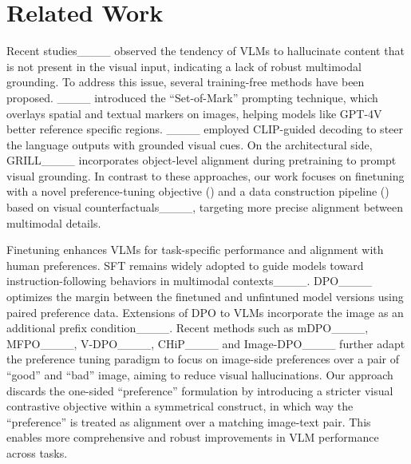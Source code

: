 \section{Related Work}
\label{sec:related}
Recent studies____ observed the tendency of VLMs to hallucinate content that is not present in the visual input, indicating a lack of robust multimodal grounding. 
To address this issue, several training-free methods have been proposed. ____ introduced the ``Set-of-Mark'' prompting technique, which overlays spatial and textual markers on images, helping models like GPT-4V better reference specific regions. ____ employed CLIP-guided decoding to steer the language outputs with grounded visual cues. 
On the architectural side, GRILL____ incorporates object-level alignment during pretraining to prompt visual grounding.
In contrast to these approaches, our work focuses on finetuning with a novel preference-tuning objective () and a data construction pipeline () based on visual counterfactuals____, targeting more precise alignment between multimodal details.

Finetuning enhances VLMs for task-specific performance and alignment with human preferences. 
SFT remains widely adopted to guide models toward instruction-following behaviors in multimodal contexts____. 
DPO____ optimizes the margin between the finetuned and unfintuned model versions using paired preference data. Extensions of DPO to VLMs incorporate the image as an additional prefix condition____. 
Recent methods such as mDPO____, MFPO____, V-DPO____, CHiP____ and Image-DPO____ further adapt the preference tuning paradigm to focus on image-side preferences over a pair of ``good'' and ``bad'' image, aiming to reduce visual hallucinations.
Our approach \modelname discards the one-sided ``preference'' formulation by introducing a stricter visual contrastive objective within a symmetrical construct, in which way the ``preference'' is treated as alignment over a matching image-text pair. This enables more comprehensive and robust improvements in VLM performance across tasks.